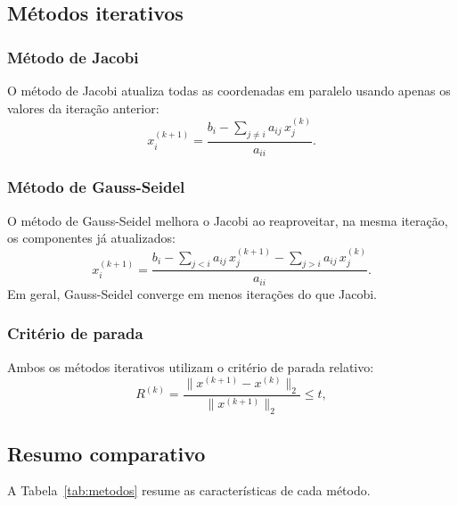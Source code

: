 \documentclass[12pt, a4paper]{article}
\begin{document}
\subsection{Métodos iterativos}
 
\subsubsection{Método de Jacobi}
 
O método de Jacobi atualiza todas as coordenadas em paralelo usando apenas os valores
da iteração anterior:
\begin{equation}
  x_i^{(k+1)} = \frac{b_i - \sum_{j \neq i} a_{ij}\,x_j^{(k)}}{a_{ii}}.
  \label{eq:jacobi}
\end{equation}
 
\subsubsection{Método de Gauss-Seidel}
 
O método de Gauss-Seidel melhora o Jacobi ao reaproveitar, na mesma iteração, os
componentes já atualizados:
\begin{equation}
  x_i^{(k+1)} = \frac{b_i
    - \displaystyle\sum_{j < i} a_{ij}\,x_j^{(k+1)}
    - \displaystyle\sum_{j > i} a_{ij}\,x_j^{(k)}}{a_{ii}}.
  \label{eq:gs}
\end{equation}
Em geral, Gauss-Seidel converge em menos iterações do que Jacobi.
 
\subsubsection{Critério de parada}
 
Ambos os métodos iterativos utilizam o critério de parada relativo:
\begin{equation}
  R^{(k)} = \frac{\|x^{(k+1)} - x^{(k)}\|_2}{\|x^{(k+1)}\|_2} \leq t,
  \label{eq:criterio}
\end{equation}
 
\subsection{Resumo comparativo}
 
A Tabela~\ref{tab:metodos} resume as características de cada método.
 
\end{document}
